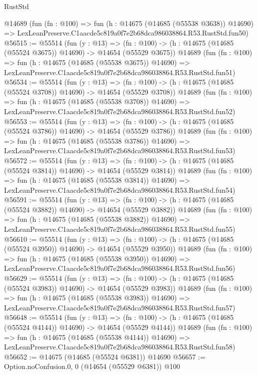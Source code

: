 \begin{lexlean}{RustStd}
\begin{coremodule}
    @14689
    (fun (fn : @100) =>
    fun (h : @14675 (@14685 (@55538 @3638)) @14690) =>
    LexLeanPreserve.C1aacde5c819a0f7e2b68dca986038864.R53.RustStd.fun50)
@56515 := @55514
    (fun (y : @13) =>
    (fn : @100) -> (h : @14675 (@14685 (@55524 @3675)) @14690) -> @14654 (@55529 @3675))
    @14689
    (fun (fn : @100) =>
    fun (h : @14675 (@14685 (@55538 @3675)) @14690) =>
    LexLeanPreserve.C1aacde5c819a0f7e2b68dca986038864.R53.RustStd.fun51)
@56534 := @55514
    (fun (y : @13) =>
    (fn : @100) -> (h : @14675 (@14685 (@55524 @3708)) @14690) -> @14654 (@55529 @3708))
    @14689
    (fun (fn : @100) =>
    fun (h : @14675 (@14685 (@55538 @3708)) @14690) =>
    LexLeanPreserve.C1aacde5c819a0f7e2b68dca986038864.R53.RustStd.fun52)
@56553 := @55514
    (fun (y : @13) =>
    (fn : @100) -> (h : @14675 (@14685 (@55524 @3786)) @14690) -> @14654 (@55529 @3786))
    @14689
    (fun (fn : @100) =>
    fun (h : @14675 (@14685 (@55538 @3786)) @14690) =>
    LexLeanPreserve.C1aacde5c819a0f7e2b68dca986038864.R53.RustStd.fun53)
@56572 := @55514
    (fun (y : @13) =>
    (fn : @100) -> (h : @14675 (@14685 (@55524 @3814)) @14690) -> @14654 (@55529 @3814))
    @14689
    (fun (fn : @100) =>
    fun (h : @14675 (@14685 (@55538 @3814)) @14690) =>
    LexLeanPreserve.C1aacde5c819a0f7e2b68dca986038864.R53.RustStd.fun54)
@56591 := @55514
    (fun (y : @13) =>
    (fn : @100) -> (h : @14675 (@14685 (@55524 @3882)) @14690) -> @14654 (@55529 @3882))
    @14689
    (fun (fn : @100) =>
    fun (h : @14675 (@14685 (@55538 @3882)) @14690) =>
    LexLeanPreserve.C1aacde5c819a0f7e2b68dca986038864.R53.RustStd.fun55)
@56610 := @55514
    (fun (y : @13) =>
    (fn : @100) -> (h : @14675 (@14685 (@55524 @3950)) @14690) -> @14654 (@55529 @3950))
    @14689
    (fun (fn : @100) =>
    fun (h : @14675 (@14685 (@55538 @3950)) @14690) =>
    LexLeanPreserve.C1aacde5c819a0f7e2b68dca986038864.R53.RustStd.fun56)
@56629 := @55514
    (fun (y : @13) =>
    (fn : @100) -> (h : @14675 (@14685 (@55524 @3983)) @14690) -> @14654 (@55529 @3983))
    @14689
    (fun (fn : @100) =>
    fun (h : @14675 (@14685 (@55538 @3983)) @14690) =>
    LexLeanPreserve.C1aacde5c819a0f7e2b68dca986038864.R53.RustStd.fun57)
@56648 := @55514
    (fun (y : @13) =>
    (fn : @100) -> (h : @14675 (@14685 (@55524 @4144)) @14690) -> @14654 (@55529 @4144))
    @14689
    (fun (fn : @100) =>
    fun (h : @14675 (@14685 (@55538 @4144)) @14690) =>
    LexLeanPreserve.C1aacde5c819a0f7e2b68dca986038864.R53.RustStd.fun58)
@56652 := @14675 (@14685 (@55524 @6381)) @14690
@56657 := Option.noConfusion.{0, 0} (@14654 (@55529 @6381)) @100

\end{coremodule}
\end{lexlean}

